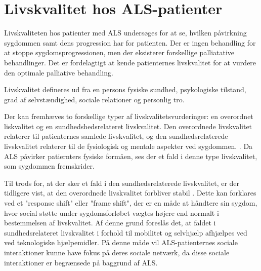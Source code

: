 \section{Livskvalitet hos ALS-patienter}
Livskvaliteten hos patienter med ALS undersøges for at se, hvilken påvirkning sygdommen samt dens progression har for patienten. Der er ingen behandling for at stoppe sygdomsprogressionen, men der eksisterer forskellige palliatative behandlinger. Det er fordelagtigt at kende patienternes livskvalitet for at vurdere den optimale palliative behandling.\citep{neudert2004,ilse2015}

Livskvalitet defineres ud fra en persons fysiske sundhed, psykologiske tilstand, grad af selvstændighed, sociale relationer og personlig tro. \citep{pagnini2013}

Der kan fremhæves to forskellige typer af livskvalitetsvurderinger: en overordnet liskvalitet og en sundhedshedsrelateret livskvalitet. 
Den overordnede livskvalitet relaterer til patienternes samlede livskvalitet, og den sundhedsrelaterede livskvalitet relaterer til de fysiologisk og mentale aspekter ved sygdommen. \citep{ilse2015, nuebert2004}. Da ALS påvirker patiernters fysiske formåen, ses der et fald i denne type livskvalitet, som sygdommen fremskrider. \citep{ilse2015}   

Til trods for, at der sker et fald i den sundhedsrelaterede livskvalitet, er der tidligere vist, at den overordnede livskvalitet forbliver stabil \citep{ilse2015, nuebert2004}. Dette kan forklares ved et "response shift" eller "frame shift", der er en måde at håndtere sin sygdom, hvor social støtte under sygdomsforløbet vægtes højere end normalt i bestemmelsen af livskvalitet. \citep{ilse2015} Af denne grund foreslås det, at faldet i sundhedsrelateret livskvalitet i forhold til mobilitet og selvhjælp afhjælpes ved ved teknologiske hjælpemidler. På denne måde vil ALS-patienternes sociale interaktioner kunne have fokus på deres sociale netværk, da disse sociale interaktioner er begrænsede på baggrund af ALS. \citep{ilse2015,tramonti2012}

